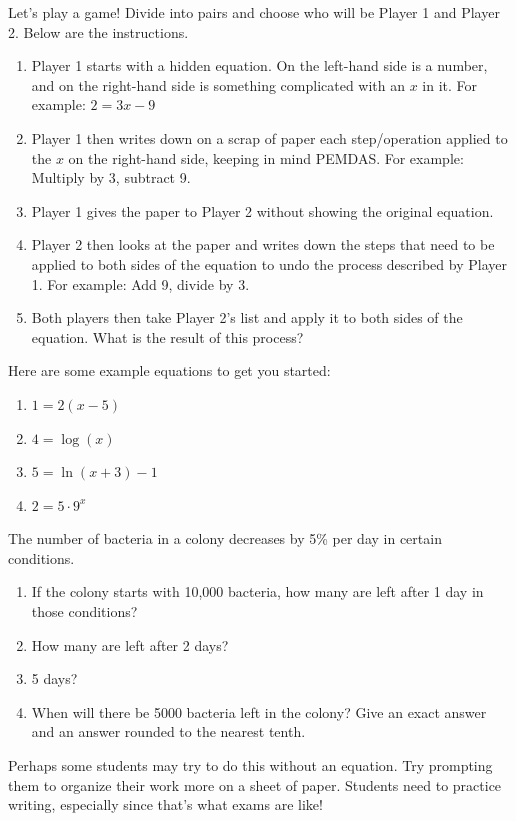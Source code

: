\documentclass[noauthor,noinstructornotes]{ximera}
\begin{document}
\begin{problem}
Let's play a game! Divide into pairs and choose who will be
Player 1 and Player 2. Below are the instructions.

\begin{enumerate}
    \item Player 1 starts with a hidden equation. On the left-hand side
    is a number, and on the right-hand side is something complicated
    with an \(x\) in it. For example: \(2 = 3x - 9\)
    \item Player 1 then writes down on a scrap of paper each step/operation
    applied to the \(x\) on the right-hand side, keeping in mind PEMDAS.
    For example: Multiply by 3, subtract 9.
    \item Player 1 gives the paper to Player 2 without showing the original
    equation.
    \item Player 2 then looks at the paper and writes down the steps
    that need to be applied to both sides of the equation to undo
    the process described by Player 1. For example: Add 9, divide by 3.
    \item Both players then take Player 2's list and apply it to both sides
    of the equation. What is the result of this process?
\end{enumerate}

Here are some example equations to get you started:
\begin{enumerate}
    \item \(1 = 2(x - 5)\)
    \item \(4 = \log(x)\)
    \item \(5 = \ln(x + 3) - 1\)
    \item \(2 = 5 \cdot 9^x\) 
\end{enumerate}
\end{problem}

\begin{problem}
The number of bacteria in a colony decreases by 5\% per day in certain conditions.

\begin{enumerate}
    \item If the colony starts with 10,000 bacteria, how many are left
    after 1 day in those conditions?
    \item How many are left after 2 days?
    \item 5 days?
    \item When will there be 5000 bacteria left in the colony? Give an exact answer and an answer rounded to the nearest tenth. 
\end{enumerate}

\begin{instructorNotes}
Perhaps some students may try to do this without an equation. Try 
prompting them to organize their work more on a sheet of paper.
Students need to practice writing, especially since that's what exams 
are like!
\end{instructorNotes}
\end{problem}
\end{document}
